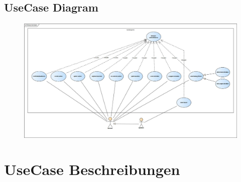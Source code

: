 \documentclass[DIV=13, 10pt,a4paper]{scrartcl}
\begin{document}
\newpage
\begin{landscape}
	\thispagestyle{empty}
	\section{UseCase Diagram}
	\begin{figure}[h!]
		\centering
		\includegraphics[width=\textheight]{docs/1_UseCaseDiagramme/PrimaryUseCases.jpg}
	\end{figure}
	\restoregeometry
\end{landscape}

\newpage
\section{UseCase Beschreibungen}




\end{document}
